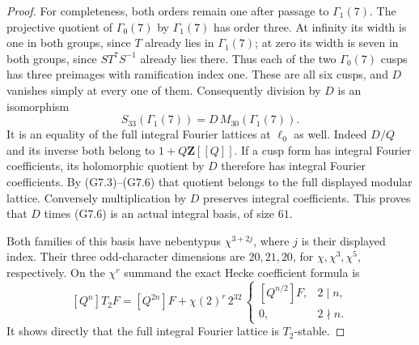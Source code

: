 \begin{proof}
For completeness, both orders remain one after passage to
\(\Gamma_1(7)\). The projective quotient of
\(\Gamma_0(7)\) by \(\Gamma_1(7)\) has order three.
At infinity its width is one in both groups, since \(T\)
already lies in \(\Gamma_1(7)\); at zero its width is seven
in both groups, since \(ST^7S^{-1}\) already lies there.
Thus each of the two \(\Gamma_0(7)\) cusps has three
preimages with ramification index one. These are all six
cusps, and \(D\) vanishes simply at every one of them.
Consequently division by \(D\) is an isomorphism
\[
 S_{33}(\Gamma_1(7))=D\,M_{30}(\Gamma_1(7)).
 \tag{G7.9}
\]
It is an equality of the full integral Fourier lattices
at \(\ell_0\) as well. Indeed \(D/Q\) and its inverse both
belong to \(1+Q\mathbf Z[[Q]]\). If a cusp form has integral
Fourier coefficients, its holomorphic quotient by \(D\)
therefore has integral Fourier coefficients. By (G7.3)--(G7.6)
that quotient belongs to the full displayed modular lattice.
Conversely multiplication by \(D\) preserves integral
coefficients. This proves that \(D\) times (G7.6) is an
actual integral basis, of size \(61\).

Both families of this basis have nebentypus
\(\chi^{3+2j}\), where \(j\) is their displayed index.
Their three odd-character dimensions are \(20,21,20\),
for \(\chi,\chi^3,\chi^5\), respectively.
On the \(\chi^r\) summand the exact Hecke coefficient formula is
\[
 [Q^n]T_2F=[Q^{2n}]F+
       \chi(2)^r\,2^{32}\,
       \begin{cases}[Q^{n/2}]F,&2\mid n,\\0,&2\nmid n.\end{cases}
 \tag{G7.10}
\]
It shows directly that the full integral Fourier lattice is
\(T_2\)-stable.


\end{proof}
